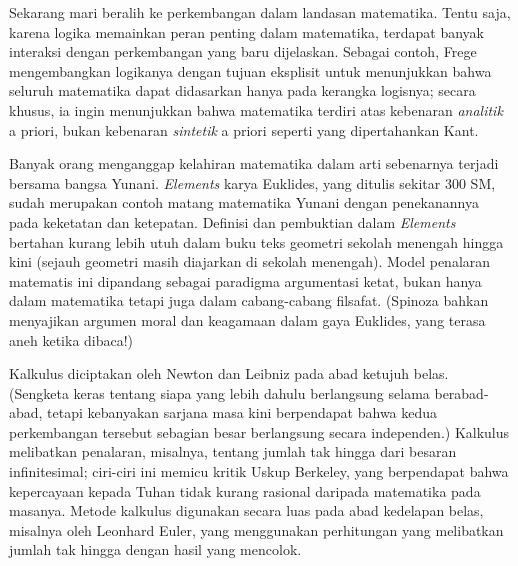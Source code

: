 \documentclass[../../../include/open-logic-section]{subfiles}
\begin{document}
Sekarang mari beralih ke perkembangan dalam landasan matematika. Tentu saja,
karena logika memainkan peran penting dalam matematika, terdapat banyak
interaksi dengan perkembangan yang baru dijelaskan. Sebagai contoh, Frege
mengembangkan logikanya dengan tujuan eksplisit untuk menunjukkan bahwa
seluruh matematika dapat didasarkan hanya pada kerangka logisnya; secara
khusus, ia ingin menunjukkan bahwa matematika terdiri atas kebenaran
\emph{analitik} a priori, bukan kebenaran \emph{sintetik} a priori seperti
yang dipertahankan Kant.

Banyak orang menganggap kelahiran matematika dalam arti sebenarnya terjadi
bersama bangsa Yunani. \emph{Elements} karya Euklides, yang ditulis sekitar
300 SM, sudah merupakan contoh matang matematika Yunani dengan penekanannya
pada keketatan dan ketepatan. Definisi dan pembuktian dalam \emph{Elements}
bertahan kurang lebih utuh dalam buku teks geometri sekolah menengah hingga
kini (sejauh geometri masih diajarkan di sekolah menengah). Model penalaran
matematis ini dipandang sebagai paradigma argumentasi ketat, bukan hanya dalam
matematika tetapi juga dalam cabang-cabang filsafat. (Spinoza bahkan
menyajikan argumen moral dan keagamaan dalam gaya Euklides, yang terasa aneh
ketika dibaca!)

Kalkulus diciptakan oleh Newton dan Leibniz pada abad ketujuh belas. (Sengketa
keras tentang siapa yang lebih dahulu berlangsung selama berabad-abad, tetapi
kebanyakan sarjana masa kini berpendapat bahwa kedua perkembangan tersebut
sebagian besar berlangsung secara independen.) Kalkulus melibatkan penalaran,
misalnya, tentang jumlah tak hingga dari besaran infinitesimal;
ciri-ciri ini memicu kritik Uskup Berkeley, yang berpendapat bahwa kepercayaan
kepada Tuhan tidak kurang rasional daripada matematika pada masanya. Metode
kalkulus digunakan secara luas pada abad kedelapan belas, misalnya oleh
Leonhard Euler, yang menggunakan perhitungan yang melibatkan jumlah tak hingga
dengan hasil yang mencolok.
\end{document}

